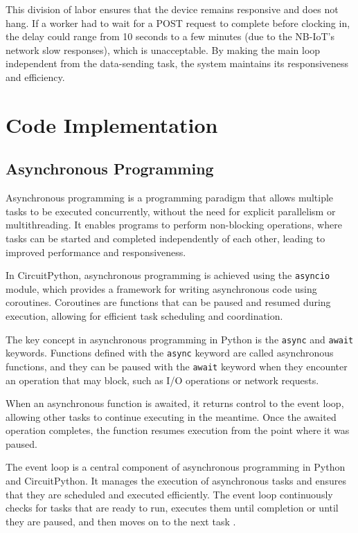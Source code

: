 This division of labor ensures that the device remains responsive and does not hang. If a worker 
had to wait for a POST request to complete before clocking in, the delay could range from 10 
seconds to a few minutes (due to the NB-IoT's network slow responses), which is unacceptable. By 
making the main loop independent from the data-sending task, the system maintains its 
responsiveness and efficiency.


%
%

\section{Code Implementation}

\subsection{Asynchronous Programming}

Asynchronous programming is a programming paradigm that allows multiple tasks to be executed 
concurrently, without the need for explicit parallelism or multithreading. It enables programs to 
perform non-blocking operations, where tasks can be started and completed independently of each 
other, leading to improved performance and responsiveness.

In CircuitPython, asynchronous programming is achieved using the \texttt{asyncio} module, which 
provides a framework for writing asynchronous code using coroutines. Coroutines are functions 
that can be paused and resumed during execution, allowing for efficient task scheduling and 
coordination.

The key concept in asynchronous programming in Python is the \texttt{async} and \texttt{await} 
keywords. Functions defined with the \texttt{async} keyword are called asynchronous functions, and 
they can be paused with the \texttt{await} keyword when they encounter an operation that may block, 
such as I/O operations or network requests.

When an asynchronous function is awaited, it returns control to the event loop, allowing other 
tasks to continue executing in the meantime. Once the awaited operation completes, the function 
resumes execution from the point where it was paused.

The event loop is a central component of asynchronous programming in Python and CircuitPython. It 
manages the execution of asynchronous tasks and ensures that they are scheduled and executed 
efficiently. The event loop continuously checks for tasks that are ready to run, executes them 
until completion or until they are paused, and then moves on to the next task 
\cite{circuitpython_docs}.

